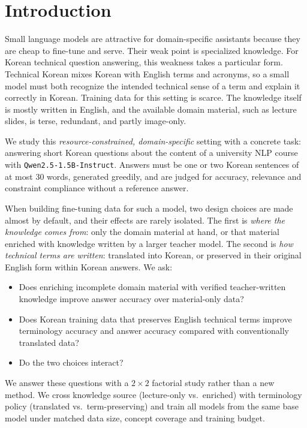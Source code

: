 \section{Introduction}
\label{sec:intro}

Small language models are attractive for domain-specific assistants because they are cheap to fine-tune and serve.
Their weak point is specialized knowledge.
For Korean technical question answering, this weakness takes a particular form.
Technical Korean mixes Korean with English terms and acronyms, so a small model must both recognize the intended technical sense of a term and explain it correctly in Korean.
Training data for this setting is scarce.
The knowledge itself is mostly written in English, and the available domain material, such as lecture slides, is terse, redundant, and partly image-only.

We study this \emph{resource-constrained, domain-specific} setting with a concrete task: answering short Korean questions about the content of a university NLP course with \texttt{Qwen2.5-1.5B-Instruct}.
Answers must be one or two Korean sentences of at most 30 words, generated greedily, and are judged for accuracy, relevance and constraint compliance without a reference answer.

When building fine-tuning data for such a model, two design choices are made almost by default, and their effects are rarely isolated.
The first is \emph{where the knowledge comes from}: only the domain material at hand, or that material enriched with knowledge written by a larger teacher model.
The second is \emph{how technical terms are written}: translated into Korean, or preserved in their original English form within Korean answers.
We ask:
\begin{itemize}
\item[\textbf{RQ1}] Does enriching incomplete domain material with verified teacher-written knowledge improve answer accuracy over material-only data?
\item[\textbf{RQ2}] Does Korean training data that preserves English technical terms improve terminology accuracy and answer accuracy compared with conventionally translated data?
\item[\textbf{RQ3}] Do the two choices interact?
\end{itemize}

We answer these questions with a $2\times2$ factorial study rather than a new method.
We cross knowledge source (lecture-only vs.\ enriched) with terminology policy (translated vs.\ term-preserving) and train all models from the same base model under matched data size, concept coverage and training budget.


